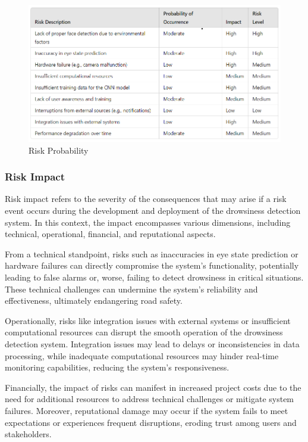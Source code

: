 \documentclass[12pt]{article}
\begin{document}
\begin{figure}[h]
\centering
\includegraphics[width=1.0\textwidth]{probab}
\caption{Risk Probability}
\end{figure}
\FloatBarrier

\subsubsection{Risk Impact }
Risk impact refers to the severity of the consequences that may arise if a risk event occurs during the development and deployment of the drowsiness detection system. In this context, the impact encompasses various dimensions, including technical, operational, financial, and reputational aspects. 

From a technical standpoint, risks such as inaccuracies in eye state prediction or hardware failures can directly compromise the system's functionality, potentially leading to false alarms or, worse, failing to detect drowsiness in critical situations. These technical challenges can undermine the system's reliability and effectiveness, ultimately endangering road safety.

Operationally, risks like integration issues with external systems or insufficient computational resources can disrupt the smooth operation of the drowsiness detection system. Integration issues may lead to delays or inconsistencies in data processing, while inadequate computational resources may hinder real-time monitoring capabilities, reducing the system's responsiveness.

Financially, the impact of risks can manifest in increased project costs due to the need for additional resources to address technical challenges or mitigate system failures. Moreover, reputational damage may occur if the system fails to meet expectations or experiences frequent disruptions, eroding trust among users and stakeholders.
\end{document}
